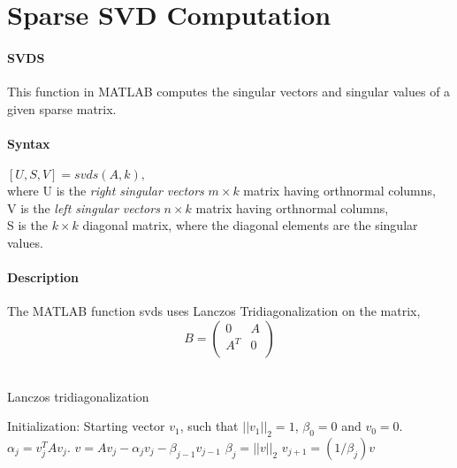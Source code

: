 \chapter{Sparse SVD Computation}
\label{app:SVDS}

\subsubsection{SVDS} 

This function in MATLAB computes the singular vectors and singular values of a given sparse matrix. \\


\subsubsection{Syntax} 

$[U,S,V]=svds(A,k),$ \\
where U is the \emph{right singular vectors} $m \times k$ matrix having orthnormal columns, \\
      V is the \emph{left singular vectors} $n \times k$ matrix having orthnormal columns, \\
      S is the $k \times k$ diagonal matrix, where the diagonal elements are the singular values. \\
      
\subsubsection{Description}
The MATLAB function svds uses Lanczos Tridiagonalization on the matrix,
\[
  B = \begin{pmatrix}
   0          &   A            \\
      A^T      & 0     \\

 \end{pmatrix}
\] \\


\begin{algorithm}
\caption{Lanczos tridiagonalization}
\begin{algorithmic}
Initialization: Starting vector $v_1$, such that $||v_1||_2=1$, $\beta_{0}=0$ and $v_0=0$.
  \State$\alpha_{j}=v_j^{T}Av_j$.
  \State$v=Av_j-\alpha_jv_j-\beta_{j-1}v_{j-1}$
  \State$\beta_j=||v||_2$
  \State$v_{j+1}=(1/\beta_j)v$  
 \EndFor
\end{algorithmic}

\end{algorithm}


